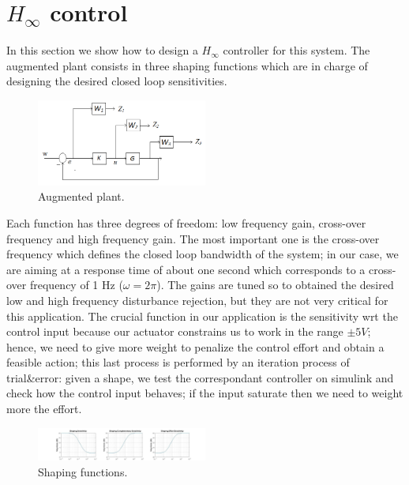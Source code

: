 \section{$H_{\infty}$ control}
In this section we show how to design a $H_{\infty}$ controller for this system. The augmented plant consists in three shaping functions which are in charge of designing the desired closed loop sensitivities.\\

\begin{figure}[H]
\includegraphics[width=0.5\textwidth]{img/hinf_scheme.png}
\caption{Augmented plant.}
\end{figure}

Each function has three degrees of freedom: low frequency gain, cross-over frequency and high frequency gain. The most important one is the cross-over frequency which defines the closed loop bandwidth of the system; in our case, we are aiming at a response time of about one second which corresponds to a cross-over frequency of 1 Hz ($\omega=2\pi$). The gains are tuned so to obtained the desired low and high frequency disturbance rejection, but they are not very critical for this application. The crucial function in our application is the sensitivity wrt the control input because our actuator constrains us to work in the range $\pm 5V$; hence, we need to give more weight to penalize the control effort and obtain a feasible action; this last process is performed by an iteration process of trial&error: given a shape, we test the correspondant controller on simulink and check how the control input behaves; if the input saturate then we need to weight more the effort.\\

\begin{figure}[H]
\includegraphics[width=0.5\textwidth]{img/hinf_shapes.jpg}
\caption{Shaping functions.}
\end{figure}

